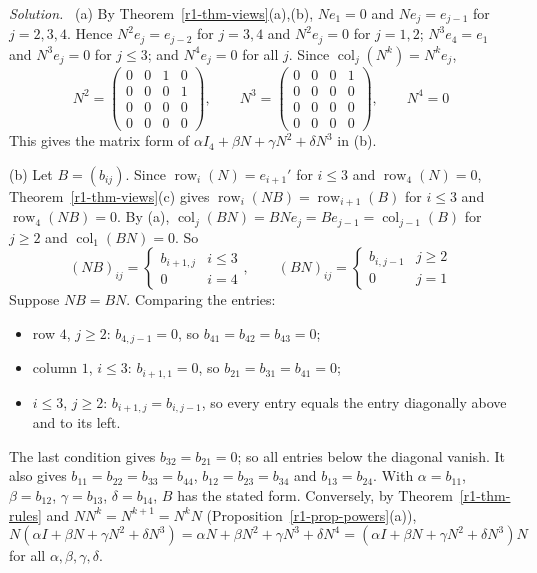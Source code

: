 \documentclass[12pt]{article}
\DeclareMathOperator{\row}{row}
\DeclareMathOperator{\col}{col}
\theoremstyle{definition}
\newenvironment{solution}{\par\noindent\textit{Solution.}\ }{\par\smallskip}
\begin{document}
\begin{solution}
(a) By Theorem~\ref{r1-thm-views}(a),(b), \(Ne_1=0\) and \(Ne_j=e_{j-1}\) for \(j=2,3,4\).
Hence \(N^2e_j=e_{j-2}\) for \(j=3,4\) and \(N^2e_j=0\) for \(j=1,2\); \(N^3e_4=e_1\) and
\(N^3e_j=0\) for \(j\leqslant3\); and \(N^4e_j=0\) for all \(j\). Since \(\col_j(N^k)=N^ke_j\),
\[
N^2=\begin{pmatrix}0&0&1&0\\0&0&0&1\\0&0&0&0\\0&0&0&0\end{pmatrix},\qquad
N^3=\begin{pmatrix}0&0&0&1\\0&0&0&0\\0&0&0&0\\0&0&0&0\end{pmatrix},\qquad N^4=0
\]
This gives the matrix form of \(\alpha I_4+\beta N+\gamma N^2+\delta N^3\) in (b).

(b) Let \(B=(b_{ij})\). Since \(\row_i(N)=e_{i+1}'\) for \(i\leqslant3\) and \(\row_4(N)=0\),
Theorem~\ref{r1-thm-views}(c) gives \(\row_i(NB)=\row_{i+1}(B)\) for \(i\leqslant3\) and
\(\row_4(NB)=0\). By (a), \(\col_j(BN)=BNe_j=Be_{j-1}=\col_{j-1}(B)\) for \(j\geqslant2\) and
\(\col_1(BN)=0\). So
\[
(NB)_{ij}=\begin{cases}b_{i+1,j}&i\leqslant3\\0&i=4\end{cases},\qquad
(BN)_{ij}=\begin{cases}b_{i,j-1}&j\geqslant2\\0&j=1\end{cases}
\]
Suppose \(NB=BN\). Comparing the entries:
\begin{itemize}
\item row \(4\), \(j\geqslant2\): \(b_{4,j-1}=0\), so \(b_{41}=b_{42}=b_{43}=0\);
\item column \(1\), \(i\leqslant3\): \(b_{i+1,1}=0\), so \(b_{21}=b_{31}=b_{41}=0\);
\item \(i\leqslant3\), \(j\geqslant2\): \(b_{i+1,j}=b_{i,j-1}\), so every entry equals the entry
diagonally above and to its left.
\end{itemize}
The last condition gives \(b_{32}=b_{21}=0\); so all entries below the diagonal vanish. It
also gives \(b_{11}=b_{22}=b_{33}=b_{44}\), \(b_{12}=b_{23}=b_{34}\) and \(b_{13}=b_{24}\).
With \(\alpha=b_{11}\), \(\beta=b_{12}\), \(\gamma=b_{13}\), \(\delta=b_{14}\), \(B\) has the
stated form. Conversely, by Theorem~\ref{r1-thm-rules} and \(NN^k=N^{k+1}=N^kN\)
(Proposition~\ref{r1-prop-powers}(a)),
\[
N(\alpha I+\beta N+\gamma N^2+\delta N^3)=\alpha N+\beta N^2+\gamma N^3+\delta N^4
=(\alpha I+\beta N+\gamma N^2+\delta N^3)N
\]
for all \(\alpha,\beta,\gamma,\delta\).
\end{solution}
\end{document}

